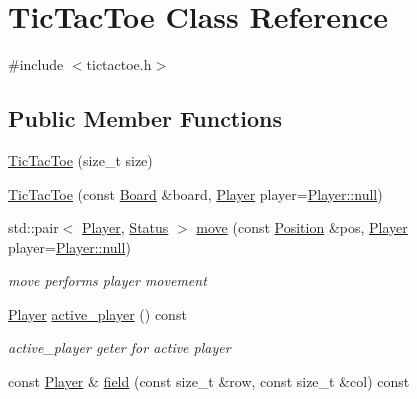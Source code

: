 \hypertarget{class_tic_tac_toe}{}\section{Tic\+Tac\+Toe Class Reference}
\label{class_tic_tac_toe}


{\ttfamily \#include $<$tictactoe.\+h$>$}

\subsection*{Public Member Functions}
\begin{DoxyCompactItemize}
\item 
\hyperlink{class_tic_tac_toe_a27555f19d0f8041ef8ce9a268ec0554c}{Tic\+Tac\+Toe} (size\+\_\+t size)
\item 
\hyperlink{class_tic_tac_toe_a85910bb5d348929c9fef9f0b23813a60}{Tic\+Tac\+Toe} (const \hyperlink{common__defs_8h_a0dc5e1c0d1c3d4b1e210c805de5ca27b}{Board} \&board, \hyperlink{common__defs_8h_a9c8780378078e51e7c9041cbac392db9}{Player} player=\hyperlink{common__defs_8h_a9c8780378078e51e7c9041cbac392db9a37a6259cc0c1dae299a7866489dff0bd}{Player\+::null})
\item 
std\+::pair$<$ \hyperlink{common__defs_8h_a9c8780378078e51e7c9041cbac392db9}{Player}, \hyperlink{common__defs_8h_a67a0db04d321a74b7e7fcfd3f1a3f70b}{Status} $>$ \hyperlink{class_tic_tac_toe_a5bbb9eeb1ab08a3d9ce857cecc3d7ffc}{move} (const \hyperlink{common__defs_8h_af9623b96ea87eb8f2d0fe97e45b0f79a}{Position} \&pos, \hyperlink{common__defs_8h_a9c8780378078e51e7c9041cbac392db9}{Player} player=\hyperlink{common__defs_8h_a9c8780378078e51e7c9041cbac392db9a37a6259cc0c1dae299a7866489dff0bd}{Player\+::null})
\begin{DoxyCompactList}\small\item\em move performs player movement \end{DoxyCompactList}\item 
\hyperlink{common__defs_8h_a9c8780378078e51e7c9041cbac392db9}{Player} \hyperlink{class_tic_tac_toe_af58c3728beedc8d250927f1f07c03dee}{active\+\_\+player} () const
\begin{DoxyCompactList}\small\item\em active\+\_\+player geter for active player \end{DoxyCompactList}\item 
const \hyperlink{common__defs_8h_a9c8780378078e51e7c9041cbac392db9}{Player} \& \hyperlink{class_tic_tac_toe_abafc7ee6550f447cf9e4c798a3658ab7}{field} (const size\+\_\+t \&row, const size\+\_\+t \&col) const

\end{DoxyCompactItemize}
